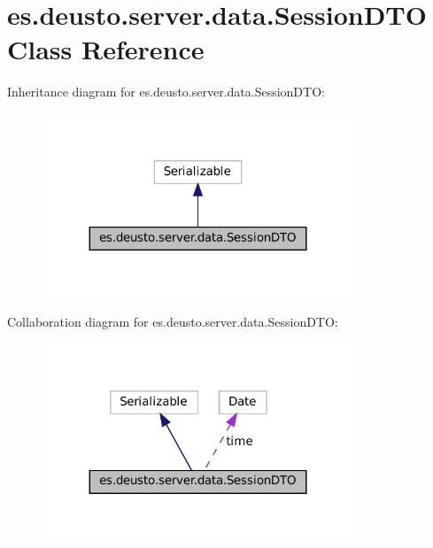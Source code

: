 \hypertarget{classes_1_1deusto_1_1server_1_1data_1_1_session_d_t_o}{}\section{es.\+deusto.\+server.\+data.\+Session\+D\+TO Class Reference}
\label{classes_1_1deusto_1_1server_1_1data_1_1_session_d_t_o}


Inheritance diagram for es.\+deusto.\+server.\+data.\+Session\+D\+TO\+:\nopagebreak
\begin{figure}[H]
\begin{center}
\leavevmode
\includegraphics[width=263pt]{classes_1_1deusto_1_1server_1_1data_1_1_session_d_t_o__inherit__graph}
\end{center}
\end{figure}


Collaboration diagram for es.\+deusto.\+server.\+data.\+Session\+D\+TO\+:\nopagebreak
\begin{figure}[H]
\begin{center}
\leavevmode
\includegraphics[width=263pt]{classes_1_1deusto_1_1server_1_1data_1_1_session_d_t_o__coll__graph}
\end{center}
\end{figure}
